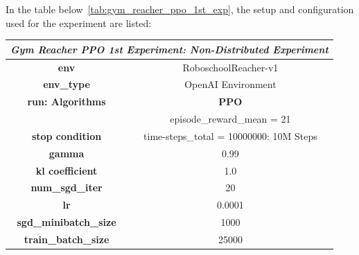 In the table below~\ref{tab:gym_reacher_ppo_1st_exp}, the setup and configuration used for the experiment are listed:
\begin{table}[!htb]
		\centering
		\begin{tabular}{|c|l|l|c|l|l|}
				\hline
				\multicolumn{6}{|c|}{\textit{\textbf{Gym Reacher PPO 1st Experiment: Non-Distributed Experiment}}}                                                        \\ \hline
				\multicolumn{3}{|c|}{\textbf{env}}                                  & \multicolumn{3}{c|}{RoboschoolReacher-v1}                                           \\ \hline
				\multicolumn{3}{|c|}{\textbf{env\_type}}                            & \multicolumn{3}{c|}{OpenAI Environment}                                             \\ \hline
				\multicolumn{3}{|c|}{\textbf{run: Algorithms}}                      & \multicolumn{3}{c|}{\cellcolor[HTML]{C0C0C0}\textbf{PPO}}                           \\ \hline
				\multicolumn{3}{|c|}{}                                              & \multicolumn{3}{c|}{\cellcolor[HTML]{E1F7E1}episode\_reward\_mean = 21}             \\ \cline{4-6} 
				\multicolumn{3}{|c|}{\multirow{-2}{*}{\textbf{stop condition}}}     & \multicolumn{3}{c|}{\cellcolor[HTML]{E1F7E1}time-steps\_total = 10000000: 10M Steps} \\ \hline
				\multicolumn{3}{|c|}{\textbf{gamma}}                                & \multicolumn{3}{c|}{0.99}                                                           \\ \hline
				\multicolumn{3}{|c|}{\textbf{kl coefficient}}                            & \multicolumn{3}{c|}{1.0}                                                            \\ \hline
				\multicolumn{3}{|c|}{\textbf{num\_sgd\_iter}}                       & \multicolumn{3}{c|}{20}                                                             \\ \hline
				\multicolumn{3}{|c|}{\textbf{lr}}                                   & \multicolumn{3}{c|}{0.0001}                                                         \\ \hline
				\multicolumn{3}{|c|}{\textbf{sgd\_minibatch\_size}}                 & \multicolumn{3}{c|}{1000}                                                           \\ \hline
				\multicolumn{3}{|c|}{\textbf{train\_batch\_size}}                   & \multicolumn{3}{c|}{25000}                                                          \\ \hline

\end{tabular}
\end{table}
